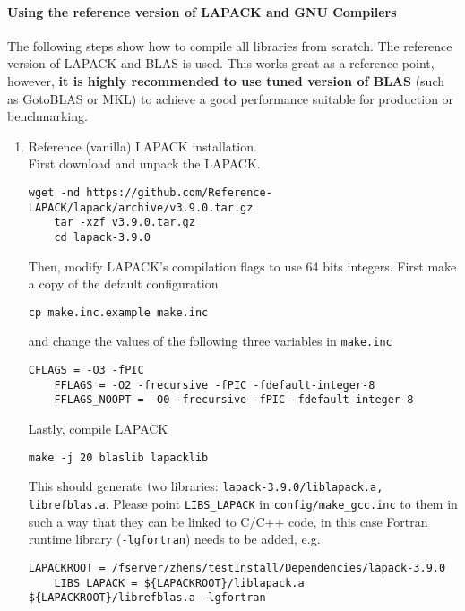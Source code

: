 \documentclass[english,11pt]{article}
\begin{document}
\paragraph{Using the reference version of LAPACK and GNU Compilers}
The following steps show how to compile all libraries from scratch. The reference version of LAPACK and BLAS is used. This works great as a reference point, however, {\bf it is  highly recommended to use tuned version of BLAS} (such as GotoBLAS or MKL) to achieve a good performance suitable for production or benchmarking.
\begin{enumerate}
    \item Reference (vanilla) LAPACK installation.\\
    First download and unpack the LAPACK.
    \begin{lstlisting}[breaklines=true, showstringspaces=false]
    wget -nd https://github.com/Reference-LAPACK/lapack/archive/v3.9.0.tar.gz
    tar -xzf v3.9.0.tar.gz
    cd lapack-3.9.0
    \end{lstlisting}
    Then, modify LAPACK's compilation flags to use 64 bits integers. First make a copy of the default configuration
    \begin{lstlisting}[breaklines=true, showstringspaces=false]
    cp make.inc.example make.inc
    \end{lstlisting}
    and change the values of the following three variables in {\tt make.inc}
    \begin{lstlisting}[breaklines=true, showstringspaces=false]
    CFLAGS = -O3 -fPIC
    FFLAGS = -O2 -frecursive -fPIC -fdefault-integer-8
    FFLAGS_NOOPT = -O0 -frecursive -fPIC -fdefault-integer-8
    \end{lstlisting}
    Lastly, compile LAPACK
    \begin{lstlisting}[breaklines=true, showstringspaces=false]
    make -j 20 blaslib lapacklib 
    \end{lstlisting}
    This should generate two libraries: {\tt lapack-3.9.0/liblapack.a, librefblas.a}. Please point {\tt LIBS_LAPACK} in {\tt config/make_gcc.inc} to them in such a way that they can be linked to C/C++ code, in this case Fortran runtime library ({\tt -lgfortran}) needs to be added, e.g.
    \begin{lstlisting}[breaklines=true, showstringspaces=false]
    LAPACKROOT = /fserver/zhens/testInstall/Dependencies/lapack-3.9.0
    LIBS_LAPACK = ${LAPACKROOT}/liblapack.a ${LAPACKROOT}/librefblas.a -lgfortran
    \end{lstlisting}
    

\end{enumerate}
\end{document}
